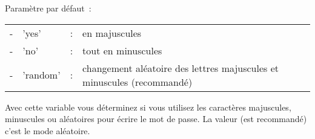 \begin{description}

   Paramètre par défaut~: 

   \begin{tabular}{rlrl}
    -&'yes'&:&en majuscules \\
    -&'no'&:&tout en minuscules \\
    -&'random'&:&changement aléatoire des lettres majuscules et minuscules (recommandé) \\
   \end{tabular}

    Avec cette variable vous déterminez si vous utilisez les caractères majuscules, minuscules
	ou aléatoires pour écrire le mot de passe. La valeur  (est recommandé)
	c'est le mode aléatoire.

\end{description}
